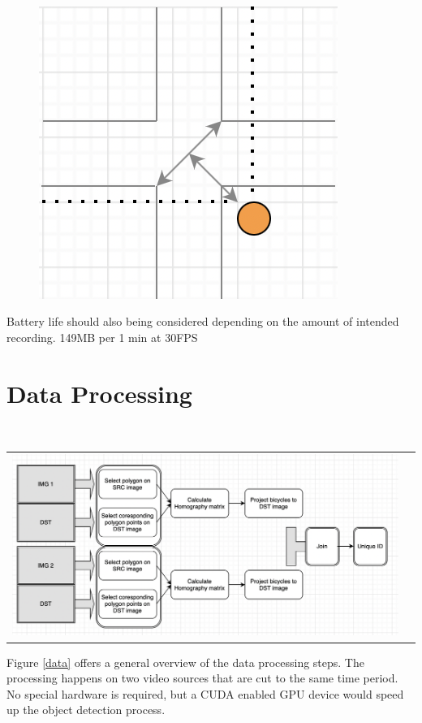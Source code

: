 \documentclass[
10pt, %
a4paper, %
oneside, %
headinclude,footinclude, %
] {book}%
\begin{document}
\ \\ 
  \begin{figure}[h]
    \includegraphics[scale=1.0]{location.png}
    \centering 
    \end{figure}
    \label{Camera location}

Battery life should also being considered depending on the amount of intended recording. 149MB per 1 min at 30FPS

\section{Data Processing}

\ \\ 
\noindent
\begin{tabular}{@{}cc}
\includegraphics[width=1.0\columnwidth]{data_flow.png} 
\end{tabular}
\label{data}


Figure \ref{data} offers a general overview of the data processing steps. The processing happens on two 
video sources that are cut to the same time period. No special hardware is required, but a CUDA enabled GPU
device would speed up the object detection process.
\ \\
\end{document}

